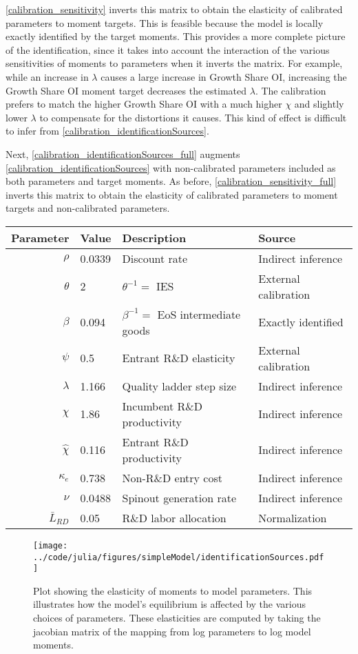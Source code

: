 \documentclass[11pt,english]{article}
\theoremstyle{remark}
\begin{document}
\autoref{calibration_sensitivity} inverts this matrix to obtain the elasticity of calibrated parameters to moment targets. This is feasible because the model is locally exactly identified by the target moments. This provides a more complete picture of the identification, since it takes into account the interaction of the various sensitivities of moments to parameters when it inverts the matrix. For example, while an increase in $\lambda$ causes a large increase in Growth Share OI, increasing the Growth Share OI moment target decreases the estimated $\lambda$. The calibration prefers to match the higher Growth Share OI with a much higher $\chi$ and slightly lower $\lambda$ to compensate for the distortions it causes. This kind of effect is difficult to infer from \autoref{calibration_identificationSources}. 

Next, \autoref{calibration_identificationSources_full} augments \autoref{calibration_identificationSources} with non-calibrated parameters included as both parameters and target moments. As before, \autoref{calibration_sensitivity_full} inverts this matrix to obtain the elasticity of calibrated parameters to moment targets and non-calibrated parameters. 

\begin{table}[]
	\centering
	\label{calibration_parameters}
	\begin{tabular}{rlll}
		\toprule \toprule
		Parameter & Value & Description & Source \tabularnewline
		\midrule
		$\rho$ & 0.0339 & Discount rate  & Indirect inference \tabularnewline
		$\theta$ & 2 & $\theta^{-1} = $ IES & External calibration 
		\tabularnewline
		$\beta$ & 0.094 & $\beta^{-1} = $ EoS intermediate goods & Exactly identified \tabularnewline 
		$\psi$ & 0.5 & Entrant R\&D elasticity & External calibration \tabularnewline
		$\lambda$ & 1.166 & Quality ladder step size & Indirect inference 
		\tabularnewline
		$\chi$ & 1.86 & Incumbent R\&D productivity & Indirect inference 
		\tabularnewline
		$\hat{\chi}$ & 0.116 & Entrant R\&D productivity & Indirect inference \tabularnewline 
		$\kappa_e$ & 0.738 & Non-R\&D entry cost & Indirect inference \tabularnewline
		$\nu$ & 0.0488 & Spinout generation rate  & Indirect inference\tabularnewline
		$\bar{L}_{RD}$ & 0.05 & R\&D labor allocation  & Normalization \tabularnewline
		\bottomrule
	\end{tabular}
\end{table}

\begin{figure}[]
	\texttt{[image: ../code/julia/figures/simpleModel/identificationSources.pdf]}
	\caption{Plot showing the elasticity of moments to model parameters. This illustrates how the model's equilibrium is affected by the various choices of parameters. These elasticities are computed by taking the jacobian matrix of the mapping from log parameters to log model moments.}
	\label{calibration_identificationSources}
\end{figure}
\end{document}
